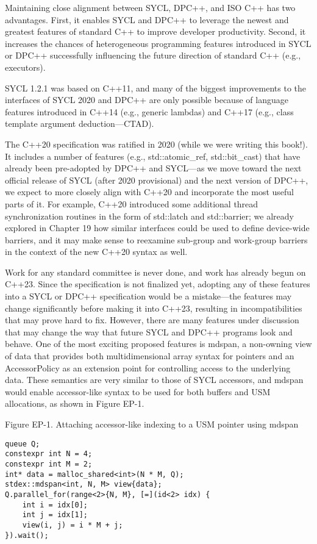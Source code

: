 Maintaining close alignment between SYCL, DPC++, and ISO C++ has two advantages. First, it enables SYCL and DPC++ to leverage the newest and greatest features of standard C++ to improve developer productivity. Second, it increases the chances of heterogeneous programming features introduced in SYCL or DPC++ successfully influencing the future direction of standard C++ (e.g., executors).\par

SYCL 1.2.1 was based on C++11, and many of the biggest improvements to the interfaces of SYCL 2020 and DPC++ are only possible because of language features introduced in C++14 (e.g., generic lambdas) and C++17 (e.g., class template argument deduction—CTAD).\par

The C++20 specification was ratified in 2020 (while we were writing this book!). It includes a number of features (e.g., std::atomic\_ref, std::bit\_cast) that have already been pre-adopted by DPC++ and SYCL—as we move toward the next official release of SYCL (after 2020 provisional) and the next version of DPC++, we expect to more closely align with C++20 and incorporate the most useful parts of it. For example, C++20 introduced some additional thread synchronization routines in the form of std::latch and std::barrier; we already explored in Chapter 19 how similar interfaces could be used to define device-wide barriers, and it may make sense to reexamine sub-group and work-group barriers in the context of the new C++20 syntax as well.\par

Work for any standard committee is never done, and work has already begun on C++23. Since the specification is not finalized yet, adopting any of these features into a SYCL or DPC++ specification would be a mistake—the features may change significantly before making it into C++23, resulting in incompatibilities that may prove hard to fix. However, there are many features under discussion that may change the way that future SYCL and DPC++ programs look and behave. One of the most exciting proposed features is mdspan, a non-owning view of data that provides both multidimensional array syntax for pointers and an AccessorPolicy as an extension point for controlling access to the underlying data. These semantics are very similar to those of SYCL accessors, and mdspan would enable accessor-like syntax to be used for both buffers and USM 
allocations, as shown in Figure EP-1.

\hspace*{\fill} \par %
Figure EP-1. Attaching accessor-like indexing to a USM pointer using mdspan
\begin{lstlisting}[caption={}]
queue Q;
constexpr int N = 4;
constexpr int M = 2;
int* data = malloc_shared<int>(N * M, Q);
stdex::mdspan<int, N, M> view{data};
Q.parallel_for(range<2>{N, M}, [=](id<2> idx) {
	int i = idx[0];
	int j = idx[1];
	view(i, j) = i * M + j;
}).wait();
\end{lstlisting}

